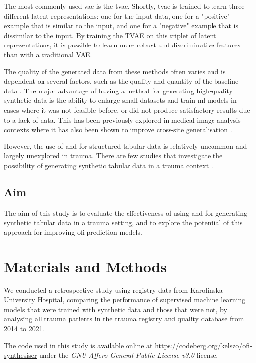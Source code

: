 \documentclass[12pt, a4paper]{article}
\begin{document}
The most commonly used \acrshort{vae} is the \acrfull{tvae}. Shortly, \acrshort{tvae} is trained to learn three different latent representations: one for the input data, one for a "positive" example that is similar to the input, and one for a "negative" example that is dissimilar to the input. By training the TVAE on this triplet of latent representations, it is possible to learn more robust and discriminative features than with a traditional VAE. \cite{ishfaq_tvae_2018}

The quality of the generated data from these methods often varies and is dependent on several factors, such as the quality and quantity of the baseline data \cite{karras_training_2020}.  The major advantage of having a method for generating high-quality synthetic data is the ability to enlarge small datasets and train \acrshort{ml}  models in cases where it was not feasible before, or did not produce satisfactory results due to a lack of data. This has been previously explored in medical image analysis contexts where it has also been shown to improve cross-site generalisation \cite{sanaat_robust-deep_2022, bashyam_deep_2022}.

However, the use of  and  for structured tabular data is relatively uncommon and largely unexplored in trauma. There are few studies that investigate the possibility of generating synthetic tabular data in a trauma context \cite{hernandez_synthetic_2022}.

\subsection{Aim}
The aim of this study is to evaluate the effectiveness of using  and  for generating synthetic tabular data in a trauma setting, and to explore the potential of this approach for improving \acrshort{ofi} prediction models.

\section{Materials and Methods}
We conducted a retrospective study using registry data from Karolinska University Hospital, comparing the performance of supervised machine learning models that were trained with synthetic data and those that were not, by analysing all trauma patients in the trauma registry and quality database from 2014 to 2021.

The code used in this study is available online at \url{https://codeberg.org/kelszo/ofi-synthesiser} under the \textit{GNU Affero General Public License v3.0} license.
\end{document}
